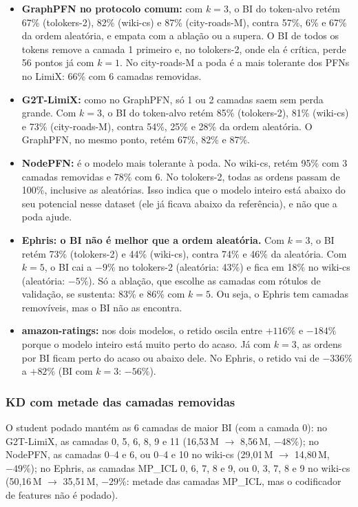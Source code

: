 \documentclass[12pt,a4paper]{article}
\begin{document}
\begin{itemize}
  \item \textbf{GraphPFN no protocolo comum:} com $k=3$, o BI do token-alvo retém 67\% (tolokers-2), 82\% (wiki-cs) e 87\% (city-roads-M), contra 57\%, 6\% e 67\% da ordem aleatória, e empata com a ablação ou a supera. O BI de todos os tokens remove a camada 1 primeiro e, no tolokers-2, onde ela é crítica, perde 56 pontos já com $k=1$. No city-roads-M a poda é a mais tolerante dos PFNs no LimiX: 66\% com 6 camadas removidas.
  \item \textbf{G2T-LimiX:} como no GraphPFN, só 1 ou 2 camadas saem sem perda grande. Com $k=3$, o BI do token-alvo retém 85\% (tolokers-2), 81\% (wiki-cs) e 73\% (city-roads-M), contra 54\%, 25\% e 28\% da ordem aleatória. O GraphPFN, no mesmo ponto, retém 67\%, 82\% e 87\%.
  \item \textbf{NodePFN:} é o modelo mais tolerante à poda. No wiki-cs, retém 95\% com 3 camadas removidas e 78\% com 6. No tolokers-2, todas as ordens passam de 100\%, inclusive as aleatórias. Isso indica que o modelo inteiro está abaixo do seu potencial nesse dataset (ele já ficava abaixo da referência), e não que a poda ajude.
  \item \textbf{Ephris: o BI não é melhor que a ordem aleatória.} Com $k=3$, o BI retém 73\% (tolokers-2) e 44\% (wiki-cs), contra 74\% e 46\% da aleatória. Com $k=5$, o BI cai a $-9\%$ no tolokers-2 (aleatória: 43\%) e fica em 18\% no wiki-cs (aleatória: $-5\%$). Só a ablação, que escolhe as camadas com rótulos de validação, se sustenta: 83\% e 86\% com $k=5$. Ou seja, o Ephris tem camadas removíveis, mas o BI não as encontra.
  \item \textbf{amazon-ratings:} nos dois modelos, o retido oscila entre $+116\%$ e $-184\%$ porque o modelo inteiro está muito perto do acaso. Já com $k=3$, as ordens por BI ficam perto do acaso ou abaixo dele. No Ephris, o retido vai de $-336\%$ a $+82\%$ (BI com $k=3$: $-56\%$).
\end{itemize}

\subsubsection{KD com metade das camadas removidas}

O student podado mantém as 6 camadas de maior BI (com a camada 0): no G2T-LimiX, as camadas 0, 5, 6, 8, 9 e 11 (16,53\,M $\to$ 8,56\,M, $-48\%$); no NodePFN, as camadas 0--4 e 6, ou 0--4 e 10 no wiki-cs (29,01\,M $\to$ 14,80\,M, $-49\%$); no Ephris, as camadas MP\_ICL 0, 6, 7, 8 e 9, ou 0, 3, 7, 8 e 9 no wiki-cs (50,16\,M $\to$ 35,51\,M, $-29\%$: metade das camadas MP\_ICL, mas o codificador de features não é podado).
\end{document}
